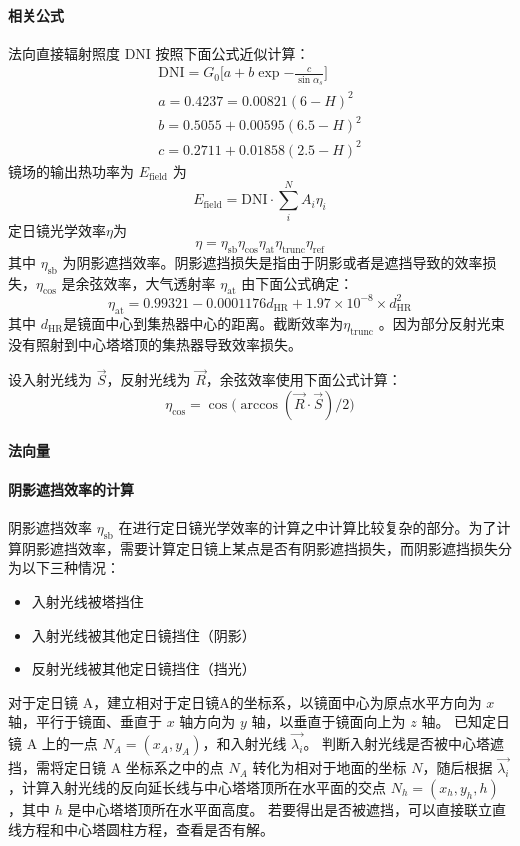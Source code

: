 \documentclass[../main.tex]{subfiles}
\begin{document}
\paragraph{相关公式}
法向直接辐射照度 DNI 按照下面公式近似计算：
\[
\begin{aligned}
\mathrm{DNI} = G_{0} \bigg[ a + b \exp{- \frac{c}{\sin \alpha_{s}}}\bigg]\\
a = 0.4237 = 0.00821 (6 - H) ^{2} \\
b = 0.5055 + 0.00595(6.5 - H) ^{2} \\
c = 0.2711 + 0.01858 (2.5 - H) ^{2}
\end{aligned}
\]
镜场的输出热功率为 \(E_{\mathrm{field}}\) 为
\[
E_{\mathrm{field}} = \mathrm{DNI} \cdot \sum _{i} ^{N} A_{i} \eta _{i}
\] 
定日镜光学效率\(\eta\)为
\begin{equation}
\eta = \eta _{\mathrm{s b}} \eta _{\cos} \eta _{\mathrm{at}} \eta _{\mathrm{trunc}} \eta _{\mathrm{ref}}
\end{equation}
其中 \(\eta _{\mathrm{s b}}\) 为阴影遮挡效率。阴影遮挡损失是指由于阴影或者是遮挡导致的效率损失，\(\eta _{\cos}\) 是余弦效率，大气透射率 \(\eta _{\mathrm{at}}\) 由下面公式确定：
\begin{equation}
\eta _{\mathrm{at}} = 0.99321 - 0.0001176 d _{\mathrm{HR}} + 1.97 \times 10 ^{-8} \times d _{\mathrm{HR}} ^{2}
\end{equation}
其中 \(d _{\mathrm{HR}}\)是镜面中心到集热器中心的距离。截断效率为\(\eta _{\mathrm{trunc}}\) 。因为部分反射光束没有照射到中心塔塔顶的集热器导致效率损失。

设入射光线为 \(\vec S\)，反射光线为 \(\vec R\)，余弦效率使用下面公式计算：
\begin{equation}
\eta _{\cos} = \cos \big(\arccos (\vec R \cdot \vec S) / 2\big)
\end{equation}
\paragraph{法向量}
\paragraph{阴影遮挡效率的计算}
阴影遮挡效率 \(\eta _{\mathrm{s b}}\) 在进行定日镜光学效率的计算之中计算比较复杂的部分。为了计算阴影遮挡效率，需要计算定日镜上某点是否有阴影遮挡损失，而阴影遮挡损失分为以下三种情况：
\begin{itemize}
\item 入射光线被塔挡住
\item 入射光线被其他定日镜挡住（阴影）
\item 反射光线被其他定日镜挡住（挡光）
\end{itemize}
对于定日镜 A，建立相对于定日镜A的坐标系，以镜面中心为原点水平方向为 \(x\) 轴，平行于镜面、垂直于 \(x\) 轴方向为 \(y\) 轴，以垂直于镜面向上为 \(z\) 轴。
已知定日镜 A 上的一点 \(N_{A} = (x_{A}, y_{A})\)，和入射光线 \(\vec {\lambda _{i}}\)。
判断入射光线是否被中心塔遮挡，需将定日镜 A 坐标系之中的点 \(N_{A}\) 转化为相对于地面的坐标 \(N\)，随后根据 \(\vec {\lambda _{i}}\)，计算入射光线的反向延长线与中心塔塔顶所在水平面的交点 \(N_{h} = (x _{h} , y_{h}, h)\)，其中 \(h\) 是中心塔塔顶所在水平面高度。
若要得出是否被遮挡，可以直接联立直线方程和中心塔圆柱方程，查看是否有解。
\end{document}
